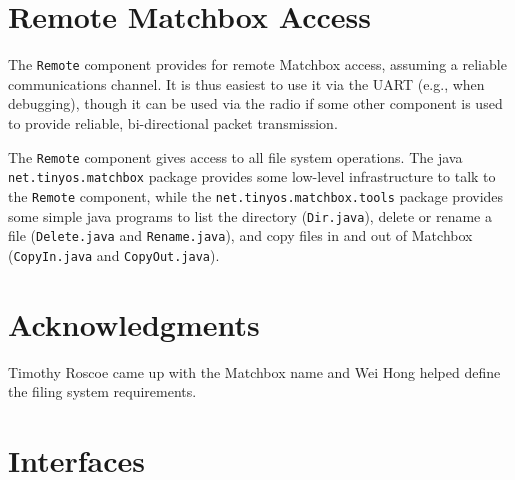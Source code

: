 \documentclass[10pt]{article}
\newcommand{\kw}[1]{\mbox{\tt #1}}
\newcommand{\code}[1]{\mbox{\tt #1}}
\begin{document}
\section{Remote Matchbox Access}

The \kw{Remote} component provides for remote Matchbox access, assuming a
reliable communications channel. It is thus easiest to use it via the UART
(e.g., when debugging), though it can be used via the radio if some other
component is used to provide reliable, bi-directional packet transmission.

The \kw{Remote} component gives access to all file system operations. The
java \code{net.tinyos.matchbox} package provides some low-level
infrastructure to talk to the \kw{Remote} component, while the
\code{net.tinyos.matchbox.tools} package provides some simple java programs
to list the directory (\code{Dir.java}), delete or rename a file
(\code{Delete.java} and \code{Rename.java}), and copy files in and out of
Matchbox (\code{CopyIn.java} and \code{CopyOut.java}).

\section{Acknowledgments}

Timothy Roscoe came up with the Matchbox name and Wei Hong helped define
the filing system requirements.

\newpage
\appendix

\section{Interfaces}
\label{sec:interfaces}

\small

\newpage

\newpage

\newpage

\newpage

\end{document}
